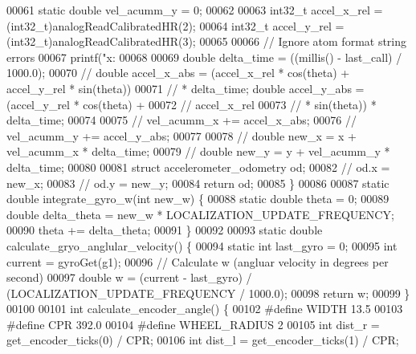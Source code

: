 \begin{DoxyCode}
{00061   \textcolor{keyword}{static} \textcolor{keywordtype}{double} vel\_acumm\_y = 0;
00062 
00063   int32\_t accel\_x\_rel = (int32\_t)analogReadCalibratedHR(2);
00064   int32\_t accel\_y\_rel = (int32\_t)analogReadCalibratedHR(3);
00065 
00066   \textcolor{comment}{// Ignore atom format string errors}
00067   printf(\textcolor{stringliteral}{"x: %
00068 
00069   \textcolor{keywordtype}{double} delta\_time = ((millis() - last_call) / 1000.0);
00070   \textcolor{comment}{// double accel\_x\_abs = (accel\_x\_rel *  cos(theta) + accel\_y\_rel * sin(theta))}
00071   \textcolor{comment}{// * delta\_time;  double accel\_y\_abs = (accel\_y\_rel *  cos(theta) +}
00072   \textcolor{comment}{// accel\_x\_rel}
00073   \textcolor{comment}{// * sin(theta)) * delta\_time;}
00074 
00075   \textcolor{comment}{// vel\_acumm\_x += accel\_x\_abs;}
00076   \textcolor{comment}{// vel\_acumm\_y += accel\_y\_abs;}
00077 
00078   \textcolor{comment}{// double new\_x = x + vel\_acumm\_x * delta\_time;}
00079   \textcolor{comment}{// double new\_y = y + vel\_acumm\_y * delta\_time;}
00080 
00081   \textcolor{keyword}{struct }accelerometer_odometry od;
00082   \textcolor{comment}{// od.x = new\_x;}
00083   \textcolor{comment}{// od.y = new\_y;}
00084   \textcolor{keywordflow}{return} od;
00085 \}
00086 
00087 \textcolor{keyword}{static} \textcolor{keywordtype}{double} integrate_gyro_w(\textcolor{keywordtype}{int} new\_w) \{
00088   \textcolor{keyword}{static} \textcolor{keywordtype}{double} theta = 0;
00089   \textcolor{keywordtype}{double} delta\_theta = new\_w * LOCALIZATION_UPDATE_FREQUENCY;
00090   theta += delta\_theta;
00091 \}
00092 
00093 \textcolor{keyword}{static} \textcolor{keywordtype}{double} calculate_gryo_anglular_velocity() \{
00094   \textcolor{keyword}{static} \textcolor{keywordtype}{int} last\_gyro = 0;
00095   \textcolor{keywordtype}{int} current = gyroGet(g1);
00096   \textcolor{comment}{// Calculate w (angluar velocity in degrees per second)}
00097   \textcolor{keywordtype}{double} w = (current - last\_gyro) / (LOCALIZATION_UPDATE_FREQUENCY / 1000.0);
00098   \textcolor{keywordflow}{return} w;
00099 \}
00100 
00101 \textcolor{keywordtype}{int} calculate_encoder_angle() \{
00102 \textcolor{preprocessor}{#define WIDTH 13.5}
00103 \textcolor{preprocessor}{#define CPR 392.0}
00104 \textcolor{preprocessor}{#define WHEEL\_RADIUS 2}
00105   \textcolor{keywordtype}{int} dist\_r = get_encoder_ticks(0) / CPR;
00106   \textcolor{keywordtype}{int} dist\_l = get_encoder_ticks(1) / CPR;
}}
\end{DoxyCode}
